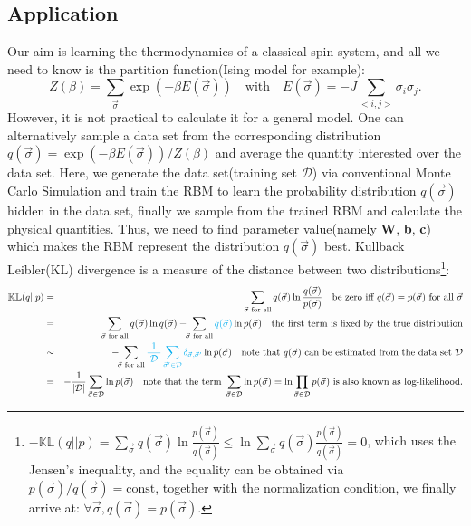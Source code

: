 \documentclass[letterpaper, 10pt]{article}
\begin{document}
\subsection{Application}
Our aim is learning the thermodynamics of a classical spin system, and all we need to know is the partition function(Ising model for example):
\begin{equation}
Z(\beta) = \sum_{\vec{\sigma}} \exp{( -\beta E(\vec{\sigma}) )} \quad{} \mathrm{with} \quad{} E(\vec{\sigma}) = -J \sum_{<i,j>} \sigma_i \sigma_j.
\end{equation}
However, it is not practical to calculate it for a general model.  One can alternatively sample a data set from the corresponding distribution $q(\vec{\sigma}) = \exp{( -\beta E(\vec{\sigma}) )} / Z(\beta)$ and average the quantity interested over the data set. Here, we generate the data set(training set $\mathcal{D}$) via conventional Monte Carlo Simulation and train the RBM to learn the probability distribution $q(\vec{\sigma})$ hidden in the data set, finally we sample from the trained RBM and calculate the physical quantities. Thus, we need to find parameter value(namely \textbf{W}, \textbf{b}, \textbf{c}) which makes the RBM represent the distribution $q(\vec{\sigma})$ best. Kullback Leibler(KL) divergence is a measure of the distance between two distributions\footnote{$-\mathbb{KL}(q||p) = \sum_{\vec{\sigma}} q(\vec{\sigma}) \ln{ \frac{p(\vec{\sigma})}{q(\vec{\sigma})} } \leq \ln \sum_{\vec{\sigma}} q(\vec{\sigma}) \frac{p(\vec{\sigma})}{q(\vec{\sigma})} = 0$, which uses the Jensen's inequality, and the equality can be obtained via $p(\vec{\sigma})/q(\vec{\sigma}) = \text{const}$, together with the normalization condition, we finally arrive at: $\forall \vec{\sigma}, q(\vec{\sigma}) = p(\vec{\sigma})$.}:
\begin{eqnarray*}
\mathbb{KL}(q||p) & = & \sum_{\vec{\sigma}\,\,\textrm{for all}} q(\vec{\sigma}) \ln{ \frac{q(\vec{\sigma})}{p(\vec{\sigma})} } \quad{} \textrm{be zero iff } q(\vec{\sigma}) = p(\vec{\sigma}) \,\, \textrm{for all }\vec{\sigma} \\
	& = & \sum_{\vec{\sigma}\,\,\textrm{for all}} q(\vec{\sigma}) \ln{q(\vec{\sigma})} - \!\!\sum_{\vec{\sigma}\,\,\textrm{for all}} {\color{cyan}{q(\vec{\sigma})}} \ln{p(\vec{\sigma})} \quad{} \textrm{the first term is fixed by the true distribution} \\
	& \sim & - \!\!\sum_{\vec{\sigma}\,\,\textrm{for all}} {\color{cyan}{\frac{1}{| \mathcal{D} |} \sum_{\vec{\sigma}' \in \mathcal{D}} \delta_{\vec{\sigma},\vec{\sigma}'}}} \ln{p(\vec{\sigma})} \quad{} \textrm{note that} \,\, q(\vec{\sigma}) \,\, \textrm{can be estimated from the data set $\mathcal{D}$} \\
	& = & - \frac{1}{|\mathcal{D}|} \sum_{\vec{\sigma} \in \mathcal{D}} \ln p(\vec{\sigma}) \quad{} \textrm{note that the term } \sum_{\vec{\sigma} \in \mathcal{D}} \ln p(\vec{\sigma}) = \ln \prod_{\vec{\sigma} \in \mathcal{D}} p(\vec{\sigma}) \,\, \textrm{is also known as log-likelihood.}
\end{eqnarray*}
\end{document}
